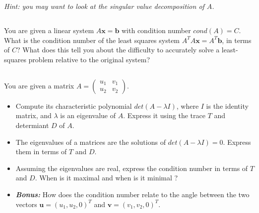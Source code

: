 \emph{Hint: you may want to look at the singular value decomposition of $A$.}

\begin{correction}

\end{correction}

\subsection{} You are given a linear system $A\mathbf{x}=\mathbf{b}$ with condition number $cond(A)=C$. What is the condition number of the least squares system $A^TA\mathbf{x}=A^T\mathbf{b}$, in terms of $C$? What does this tell you about the difficulty to accurately solve a least-squares problem relative to the original system?

\begin{correction}

\end{correction}

\subsection{} You are given a matrix $A = 
\left(\begin{matrix}
u_1 & v_1\\
u_2 & v_2
\end{matrix}\right)$.
\begin{itemize}
\item Compute its characteristic polynomial $det(A-\lambda I)$, where $I$ is the identity matrix, and $\lambda$ is an eigenvalue of $A$. Express it using the trace $T$ and determiant $D$ of $A$.
\item The eigenvalues of a matrices are the solutions of $det(A-\lambda I) = 0$. Express them in terms of $T$ and $D$.
\item Assuming the eigenvalues are real, express the condition number in terms of $T$ and $D$. When is it maximal and when is it minimal ?
\item \textit{\textbf{Bonus:} } How does the condition number relate to the angle between the two vectors $\mathbf u = (u_1,u_2,0)^T$ and $\mathbf v = (v_1,v_2,0)^T$.
  \end{itemize}

